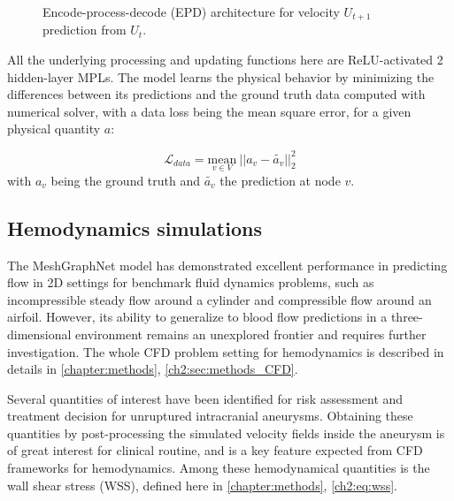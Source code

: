 \begin{figure}[!ht]
    \centering
    \resizebox{0.8\textwidth}{!}{}
    \caption{Encode-process-decode (EPD) architecture \cite{pfaff_learning_2021} for velocity $U_{t+1}$ prediction from $U_t$.}
    \label{fig:epd}
\end{figure}

All the underlying processing and updating functions here are ReLU-activated 2 hidden-layer MPLs. The model learns the physical behavior by minimizing the differences between its predictions and the ground truth data computed with numerical solver, with a data loss being the mean square error, for a given physical quantity $a$:

\begin{equation} \label{eq:loss_data}
    \mathcal{L}_{data} = \underset{v \in V}{\mathrm{mean}} \ \vert \vert a_v - \tilde{a_v} \vert \vert^2_2
\end{equation}
with $a_v$ being the ground truth and $\tilde{a_v}$ the prediction at node $v$.

\subsection{Hemodynamics simulations} \label{sec:blood_flow}

The MeshGraphNet model has demonstrated excellent performance in predicting flow in 2D settings for benchmark fluid dynamics problems, such as incompressible steady flow around a cylinder and compressible flow around an airfoil. However, its ability to generalize to blood flow predictions in a three-dimensional environment remains an unexplored frontier and requires further investigation. The whole CFD problem setting for hemodynamics is described in details in \autoref{chapter:methods}, \autoref{ch2:sec:methods_CFD}.

Several quantities of interest have been identified for risk assessment and treatment decision for unruptured intracranial aneurysms. Obtaining these quantities by post-processing the simulated velocity fields inside the aneurysm is of great interest for clinical routine, and is a key feature expected from CFD frameworks for hemodynamics. Among these hemodynamical quantities is the wall shear stress (WSS), defined here in \autoref{chapter:methods}, \autoref{ch2:eq:wss}.

